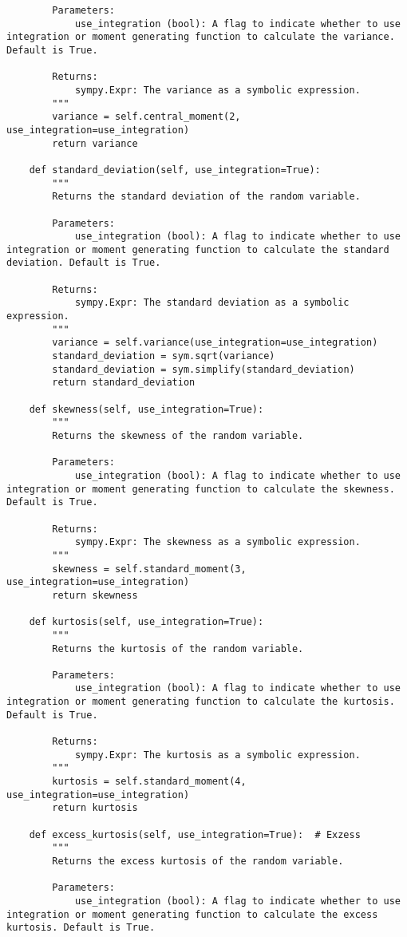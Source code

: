 \begin{small}
\begin{lstlisting}
        Parameters:
            use_integration (bool): A flag to indicate whether to use integration or moment generating function to calculate the variance. Default is True.

        Returns:
            sympy.Expr: The variance as a symbolic expression.
        """
        variance = self.central_moment(2, use_integration=use_integration)
        return variance

    def standard_deviation(self, use_integration=True):
        """
        Returns the standard deviation of the random variable.

        Parameters:
            use_integration (bool): A flag to indicate whether to use integration or moment generating function to calculate the standard deviation. Default is True.

        Returns:
            sympy.Expr: The standard deviation as a symbolic expression.
        """
        variance = self.variance(use_integration=use_integration)
        standard_deviation = sym.sqrt(variance)
        standard_deviation = sym.simplify(standard_deviation)
        return standard_deviation

    def skewness(self, use_integration=True):
        """
        Returns the skewness of the random variable.

        Parameters:
            use_integration (bool): A flag to indicate whether to use integration or moment generating function to calculate the skewness. Default is True.

        Returns:
            sympy.Expr: The skewness as a symbolic expression.
        """
        skewness = self.standard_moment(3, use_integration=use_integration)
        return skewness

    def kurtosis(self, use_integration=True):
        """
        Returns the kurtosis of the random variable.

        Parameters:
            use_integration (bool): A flag to indicate whether to use integration or moment generating function to calculate the kurtosis. Default is True.

        Returns:
            sympy.Expr: The kurtosis as a symbolic expression.
        """
        kurtosis = self.standard_moment(4, use_integration=use_integration)
        return kurtosis

    def excess_kurtosis(self, use_integration=True):  # Exzess
        """
        Returns the excess kurtosis of the random variable.

        Parameters:
            use_integration (bool): A flag to indicate whether to use integration or moment generating function to calculate the excess kurtosis. Default is True.


\end{lstlisting}
\end{small}
